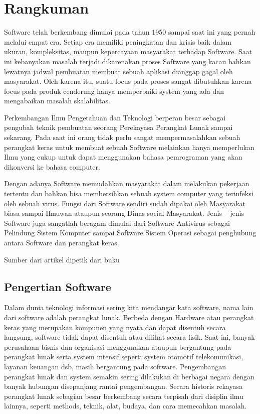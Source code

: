 \section{Rangkuman}
\begin{flushleft}
Software telah berkembang dimulai pada tahun 1950 sampai saat ini yang pernah melalui empat  era. Setiap era memiliki peningkatan dan krisis baik dalam ukuran, kompleksitas, maupun kepercayaan masyarakat terhadap Software. Saat ini kebanyakan masalah terjadi dikarenakan proses Software yang kacau bahkan lewatnya jadwal pembuatan membuat sebuah aplikasi dianggap gagal oleh masyarakat. Oleh karena itu, suatu focus pada proses sangat dibutuhkan karena focus pada produk cenderung hanya memperbaiki system yang ada dan mengabaikan masalah skalabilitas.
\end{flushleft}
\begin{flushleft}
Perkembangan Ilmu Pengetahuan dan Teknologi berperan besar sebagai pengubah teknik pembuatan seorang Perekayasa Perangkat Lunak sampai sekarang. Pada saat ini orang tidak perlu  sangat mempermasalahkan sebuah perangkat keras untuk membuat sebuah Software melainkan hanya memperlukan Ilmu yang cukup untuk dapat menggunakan bahasa pemrograman yang akan dikonversi ke bahasa computer. 
\end{flushleft}
\begin{flushleft}
Dengan adanya Software memudahkan masyarakat dalam melakukan pekerjaan tertentu dan bahkan bisa membersihkan sebuah system computer yang terinfeksi oleh sebuah virus. Fungsi dari Software sendiri sudah dipakai oleh Masyarakat biasa sampai Ilmuwan ataupun seorang Dinas social Masyarakat. Jenis – jenis Software juga sangatlah beragam dimulai dari Software Antivirus sebagai Pelindung Sistem Komputer sampai Software Sistem Operasi sebagai penghubung antara Software dan perangkat keras.
\end{flushleft}
Sumber dari artikel dipetik dari buku \cite{simarmata2010rekayasa}

\subsection{Pengertian Software}
Dalam dunia teknologi informasi sering kita mendangar kata software, nama lain dari software adalah perangkat lunak. Berbeda dengan Hardware atau perangkat keras yang merupakan kompunen yang nyata dan dapat disentuh secara langsung, software tidak dapat disentuh atau dilihat secara fisik. Saat ini, banyak perusahaan bisnis dan organisasi menggunakan ataupun bergantung pada perangkat lunak serta system intensif seperti system otomotif telekomunikasi, layanan keuangan dsb, masih bergantung pada software.
	Pengembangan perangkat lunak dan system semakin sering dilakukan di berbagai negara dengan banyak hubungan disepanjang rantai pengembangan. Secara historis rekayasa perangkat lunak sebagian besar berkembang secara terpisah dari disiplin ilmu lainnya, seperti methods, teknik, alat, budaya, dan cara memecahkan masalah.
